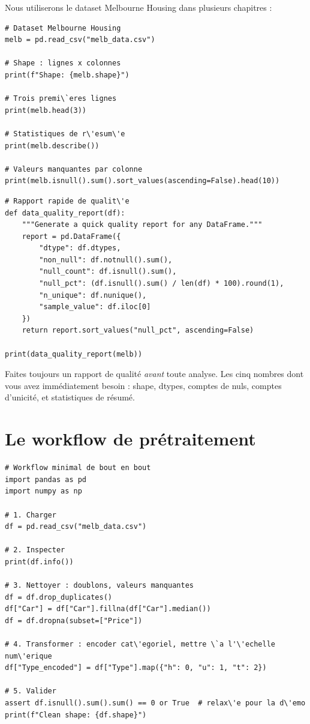 Nous utiliserons le dataset Melbourne Housing dans plusieurs chapitres :

\begin{verbatim}
# Dataset Melbourne Housing
melb = pd.read_csv("melb_data.csv")

# Shape : lignes x colonnes
print(f"Shape: {melb.shape}")

# Trois premi\`eres lignes
print(melb.head(3))

# Statistiques de r\'esum\'e
print(melb.describe())

# Valeurs manquantes par colonne
print(melb.isnull().sum().sort_values(ascending=False).head(10))
\end{verbatim}

\begin{verbatim}
# Rapport rapide de qualit\'e
def data_quality_report(df):
    """Generate a quick quality report for any DataFrame."""
    report = pd.DataFrame({
        "dtype": df.dtypes,
        "non_null": df.notnull().sum(),
        "null_count": df.isnull().sum(),
        "null_pct": (df.isnull().sum() / len(df) * 100).round(1),
        "n_unique": df.nunique(),
        "sample_value": df.iloc[0]
    })
    return report.sort_values("null_pct", ascending=False)

print(data_quality_report(melb))
\end{verbatim}

\begin{datatip}
Faites toujours un rapport de qualit\'e \emph{avant} toute analyse. Les cinq nombres dont vous avez imm\'ediatement besoin : shape, dtypes, comptes de nuls, comptes d'unicit\'e, et statistiques de r\'esum\'e.
\end{datatip}

\section{Le workflow de pr\'etraitement}

\begin{verbatim}
# Workflow minimal de bout en bout
import pandas as pd
import numpy as np

# 1. Charger
df = pd.read_csv("melb_data.csv")

# 2. Inspecter
print(df.info())

# 3. Nettoyer : doublons, valeurs manquantes
df = df.drop_duplicates()
df["Car"] = df["Car"].fillna(df["Car"].median())
df = df.dropna(subset=["Price"])

# 4. Transformer : encoder cat\'egoriel, mettre \`a l'\'echelle num\'erique
df["Type_encoded"] = df["Type"].map({"h": 0, "u": 1, "t": 2})

# 5. Valider
assert df.isnull().sum().sum() == 0 or True  # relax\'e pour la d\'emo
print(f"Clean shape: {df.shape}")
\end{verbatim}

